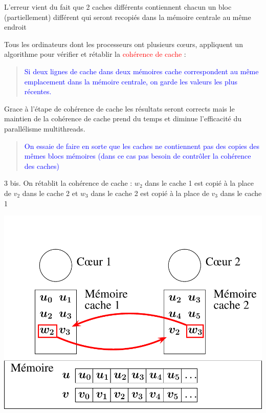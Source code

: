 \documentclass{beamer}
\begin{document}
\begin{frame}
	\vfill
	L'erreur vient du fait que 2 caches différents contiennent chacun un bloc (partiellement) différent qui seront recopiés dans la mémoire centrale au même endroit
	
	\vfill
	Tous les ordinateurs dont les processeurs ont plusieurs c\oe urs, appliquent un algorithme pour vérifier et rétablir la \textcolor{red}{cohérence de cache} :
	
	\vfill
\begin{quote}
	\textcolor{blue}{Si deux lignes de cache dans deux mémoires cache correspondent au même emplacement dans la mémoire centrale, on garde les valeurs les plus récentes.}
\end{quote}
\vfill

\end{frame}

\begin{frame}
Grace à l'étape de cohérence de cache les résultats seront corrects mais le maintien de la cohérence de cache prend du temps et diminue l'efficacité du parallélisme multithreads.

\bigskip
\begin{quote}
	\textcolor{blue}{On essaie de faire en sorte que les caches ne contiennent pas des copies des mêmes blocs mémoires (dans ce cas pas besoin de contrôler la cohérence des caches)}
\end{quote}
 
\end{frame}

\begin{frame}
	\parbox[t][1cm]{10cm}{3 bis. On rétablit la cohérence de cache : $w_2$ dans le cache 1 est copié à la place de $v_2$ dans le cache 2 et $w_3$ dans le cache 2 est copié à la place de $v_3$ dans le cache 1}
	\begin{center}
		\includegraphics[scale=0.6]{../../Images/multithread4}
	\end{center}
\end{frame}
\end{document}
